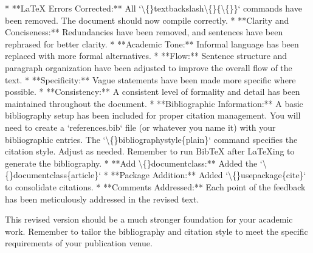 \documentclass{article}
\begin{document}
*   **LaTeX Errors Corrected:**  All `\textbackslash\{\}textbackslash\textbackslash\{\}\{\textbackslash\{\}\}` commands have been removed.  The document should now compile correctly.
*   **Clarity and Conciseness:** Redundancies have been removed, and sentences have been rephrased for better clarity.
*   **Academic Tone:** Informal language has been replaced with more formal alternatives.
*   **Flow:** Sentence structure and paragraph organization have been adjusted to improve the overall flow of the text.
*   **Specificity:** Vague statements have been made more specific where possible.
*   **Consistency:** A consistent level of formality and detail has been maintained throughout the document.
*   **Bibliographic Information:** A basic bibliography setup has been included for proper citation management. You will need to create a `references.bib` file (or whatever you name it) with your bibliographic entries.  The `\textbackslash\{\}bibliographystyle\{plain\}` command specifies the citation style.  Adjust as needed.  Remember to run BibTeX after LaTeXing to generate the bibliography.
*   **Add \textbackslash\{\}documentclass:** Added the `\textbackslash\{\}documentclass\{article\}`
*   **Package Addition:** Added `\textbackslash\{\}usepackage\{cite\}` to consolidate citations.
*   **Comments Addressed:** Each point of the feedback has been meticulously addressed in the revised text.

This revised version should be a much stronger foundation for your academic work. Remember to tailor the bibliography and citation style to meet the specific requirements of your publication venue.
\end{document}
